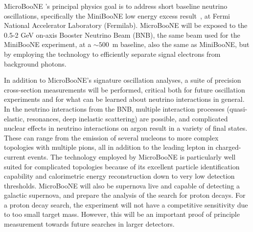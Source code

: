    
MicroBooNE 's principal physics goal is to address short baseline neutrino oscillations, specifically the MiniBooNE low energy excess result~\cite{AguilarArevalo:2008rc}, at Fermi National Accelerator Laboratory (Fermilab).  MicroBooNE will be exposed to the  0.5-2 GeV on-axis Booster Neutrino Beam (BNB), the same beam used for the MiniBooNE experiment, at a $\sim 500$~m baseline, also the same as MiniBooNE, but by employing the \lartpc technology to efficiently separate signal electrons from background photons.  

In addition to MicroBooNE's signature oscillation analyses, a suite of precision cross-section measurements will be performed, critical both for future \lartpc oscillation experiments and for what can be learned about neutrino interactions in general.   In the neutrino interactions from the BNB, multiple interaction processes (quasi-elastic, resonances, deep inelastic scattering) are possible, and complicated nuclear effects in neutrino interactions on argon result in a variety of final states. These can range from the emission of several nucleons to more complex topologies with multiple pions, all in addition to the leading lepton in charged-current events. The \lartpc technology employed by MicroBooNE is particularly well suited for complicated topologies because of its excellent particle identification capability and calorimetric energy reconstruction down to very low detection thresholds. MicroBooNE will also be supernova live and capable of detecting a galactic supernova, and prepare the analysis of  the search for proton decays. For a proton decay search, the experiment will not have a competitive sensitivity due to too small target mass. However, this will be an important proof of principle measurement towards future searches in larger detectors.  


